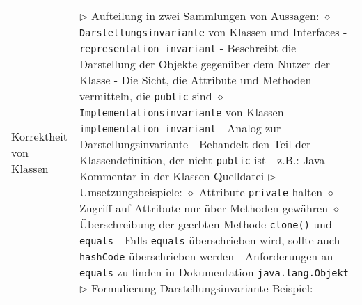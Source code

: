 \begin{longtable}{ | p{} p{} | }
	\makecell[l]{Korrektheit von \\ Klassen} & \makecell[l]{
	$\triangleright$ Aufteilung in zwei Sammlungen von Aussagen: \\
	\hspace{0.4cm} $\diamond$ \texttt{Darstellungsinvariante} von Klassen und Interfaces \\
	\hspace{0.6cm} - \texttt{representation invariant} \\
	\hspace{0.6cm} - Beschreibt die Darstellung der Objekte gegenüber dem Nutzer der Klasse \\
	\hspace{0.6cm} - Die Sicht, die Attribute und Methoden vermitteln, die \texttt{public} sind \\
	\hspace{0.4cm} $\diamond$ \texttt{Implementationsinvariante} von Klassen \\
	\hspace{0.6cm} - \texttt{implementation invariant} \\
	\hspace{0.6cm} - Analog zur Darstellungsinvariante \\
	\hspace{0.6cm} - Behandelt den Teil der Klassendefinition, der nicht \texttt{public} ist \\
	\hspace{0.6cm} - z.B.: Java-Kommentar in der Klassen-Quelldatei \\
	$\triangleright$ Umsetzungsbeispiele: \\
	\hspace{0.4cm} $\diamond$ Attribute \texttt{private} halten \\
	\hspace{0.4cm} $\diamond$ Zugriff auf Attribute nur über Methoden gewähren \\
	\hspace{0.4cm} $\diamond$ Überschreibung der geerbten Methode \texttt{clone()} und \texttt{equals} \\
	\hspace{0.6cm} - Falls \texttt{equals} überschrieben wird, sollte auch \texttt{hashCode} überschrieben werden \\
	\hspace{0.6cm} - Anforderungen an \texttt{equals} zu finden in Dokumentation \texttt{java.lang.Objekt} \\
	$\triangleright$ Formulierung Darstellungsinvariante Beispiel: \\
}
\end{longtable}
